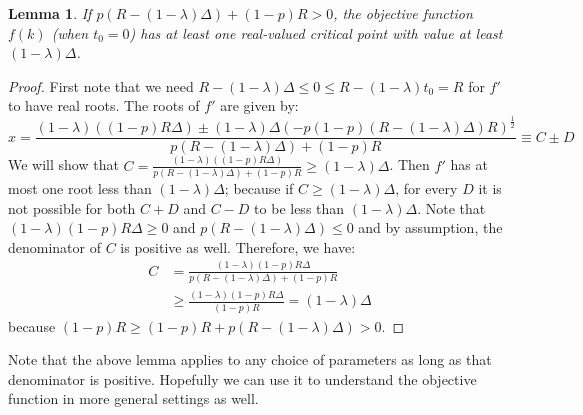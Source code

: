 \documentclass{article}
\newtheorem{lemma}{Lemma}[section]
\begin{document}
\begin{lemma}
If $p(R-(1-\lambda)\Delta)+(1-p)R > 0$, the objective function $f(k)$ (when $t_0 = 0$) has at least one real-valued critical point with value at least $(1-\lambda)\Delta$.
\end{lemma}
\begin{proof}
First note that we need $R-(1-\lambda)\Delta \leq 0 \leq R-(1-\lambda)t_0 = R$ for $f'$ to have real roots. The roots of $f'$ are given by:
\begin{equation*}
x = \frac{(1-\lambda)((1-p)R\Delta) \pm (1-\lambda)\Delta(-p(1-p)(R-(1-\lambda)\Delta)R)^{\frac{1}{2}}}{p(R-(1-\lambda)\Delta)+(1-p)R} \equiv C\pm D
\end{equation*}
We will show that $C = 
\frac{(1-\lambda)((1-p)R\Delta)}{p(R-(1-\lambda)\Delta)+(1-p)R} \geq (1-\lambda) \Delta$. Then $f'$ has at most one root less than $(1-\lambda)\Delta$; because if $C \geq (1-\lambda)\Delta$, for every $D$ it is not possible for both $C+D$ and $C-D$ to be less than $(1-\lambda)\Delta$. Note that $(1-\lambda)(1-p)R\Delta \geq 0$ and $p(R-(1-\lambda)\Delta) \leq 0$ and by assumption, the denominator of $C$ is positive as well. Therefore, we have:
\begin{align*}
C &= \frac{(1-\lambda)(1-p)R\Delta}{p(R-(1-\lambda)\Delta)+(1-p)R} \\
&\geq \frac{(1-\lambda)(1-p)R\Delta}{(1-p)R} = (1-\lambda)\Delta
\end{align*}
because $(1-p)R \geq (1-p)R+p(R-(1-\lambda)\Delta) > 0$.
\end{proof}

Note that the above lemma applies to any choice of parameters as long as that denominator is positive. Hopefully we can use it to understand the objective function in more general settings as well.
\end{document}
